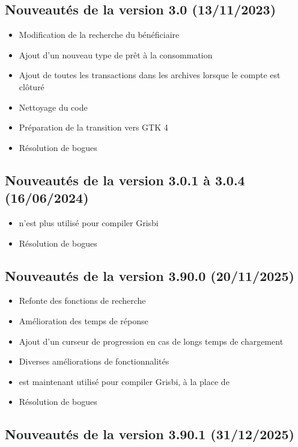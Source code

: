 \subsection{Nouveautés de la version 3.0 \textnormal{(13/11/2023)}}

\begin{itemize}
	\item Modification de la recherche du bénéficiaire
	\item Ajout d'un nouveau type de prêt à la consommation
	\item Ajout de toutes les transactions dans les archives lorsque le compte est clôturé
	\item Nettoyage du code
	\item Préparation de la transition vers \gls{GTK} 4
	\item Résolution de bogues
\end{itemize}

\subsection{Nouveautés de la version 3.0.1 à 3.0.4 \textnormal{(16/06/2024)}}

\begin{itemize}
	\item {} n'est plus utilisé pour compiler Grisbi
	\item Résolution de bogues
\end{itemize}

\subsection{Nouveautés de la version 3.90.0 \textnormal{(20/11/2025)}}

\begin{itemize}
	\item Refonte des fonctions de recherche
	\item Amélioration des temps de réponse
	\item Ajout d'un curseur de progression en cas de longs temps de chargement
	\item Diverses améliorations de fonctionnalités
	\item {} est maintenant utilisé pour compiler Grisbi, à la place de 
	\item Résolution de bogues
\end{itemize}

\subsection{Nouveautés de la version 3.90.1 \textnormal{(31/12/2025)}}

